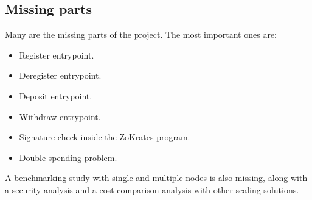 \subsection{Missing parts \label{subsec:missingParts}}
Many are the missing parts of the project. The most important ones are:
\begin{itemize}
  \item Register entrypoint.
  \item Deregister entrypoint.
  \item Deposit entrypoint.
  \item Withdraw entrypoint.
  \item Signature check inside the ZoKrates program.
  \item Double spending problem.
\end{itemize}
A benchmarking study with single and multiple nodes is also missing, along with a security analysis and a cost comparison analysis with other scaling solutions.
